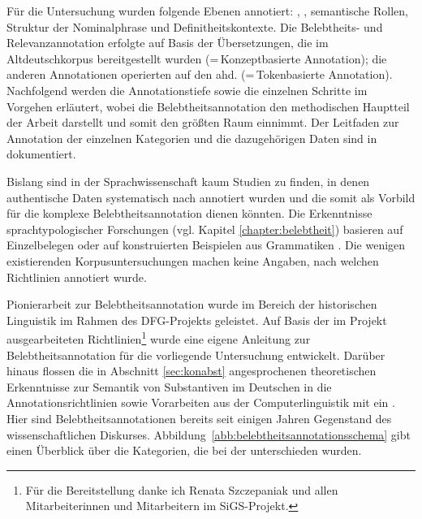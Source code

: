 Für die Untersuchung wurden folgende Ebenen  annotiert: , ,  semantische Rollen, Struktur der Nominalphrase und Definitheitskontexte. Die  Belebtheits- und Relevanzannotation erfolgte auf Basis der Übersetzungen, die im Altdeutschkorpus  bereitgestellt wurden (=\,Konzeptbasierte Annotation); die anderen Annotationen  operierten auf den ahd.   (=\,Tokenbasierte Annotation). Nachfolgend werden die Annotationstiefe  sowie die einzelnen Schritte im Vorgehen erläutert, wobei die Belebtheitsannotation den methodischen Hauptteil der Arbeit darstellt und somit den größten Raum einnimmt. Der Leitfaden zur Annotation  der einzelnen Kategorien und die dazugehörigen Daten sind in \textcite{HZKYL4_2020} dokumentiert. 


Bislang sind in der Sprachwissenschaft kaum Studien zu finden, in denen authentische Daten systematisch nach  annotiert  wurden und die somit als Vorbild für die komplexe  Belebtheitsannotation dienen könnten. Die Erkenntnisse sprachtypologischer Forschungen (vgl. Kapitel \ref{chapter:belebtheit}) basieren auf Einzelbelegen oder auf konstruierten Beispielen aus Grammatiken \parencite[z.B.][]{Comrie1989,Corbett2000,Aissen2003}. Die wenigen existierenden Korpusuntersuchungen  \parencite{Dahl1996,Yamamoto1999} machen keine Angaben, nach welchen Richtlinien annotiert  wurde.

Pionierarbeit zur Belebtheitsannotation wurde im Bereich der historischen Linguistik im Rahmen des DFG-Projekts  \parencite[vgl.][]{Szczepaniak2016} geleistet. Auf Basis der im Projekt ausgearbeiteten Richtlinien\footnote{Für die Bereitstellung danke ich Renata Szczepaniak und allen Mitarbeiterinnen und Mitarbeitern im SiGS-Projekt.} wurde eine eigene Anleitung zur Belebtheitsannotation für die vorliegende Untersuchung entwickelt. Darüber hinaus flossen die in Abschnitt \ref{sec:konabst} angesprochenen theoretischen Erkenntnisse zur Semantik von Substantiven  im Deutschen \parencite[u.a.][]{Ewald1992,Studler2011} in die Annotationsrichtlinien sowie  Vorarbeiten aus der Computerlinguistik mit ein \parencite[vgl.][]{Garretson2004,Zaenen2004,Ovrelid2009}. Hier sind Belebtheitsannotationen bereits seit einigen Jahren Gegenstand des wissenschaftlichen Diskurses. Abbildung~\ref{abb:belebtheitsannotationsschema} gibt einen Überblick über die Kategorien, die bei der  unterschieden wurden.

